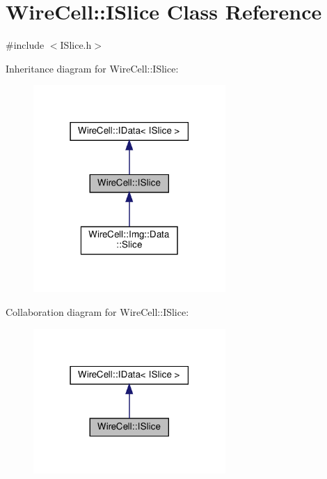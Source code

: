 \hypertarget{class_wire_cell_1_1_i_slice}{}\section{Wire\+Cell\+:\+:I\+Slice Class Reference}
\label{class_wire_cell_1_1_i_slice}


{\ttfamily \#include $<$I\+Slice.\+h$>$}



Inheritance diagram for Wire\+Cell\+:\+:I\+Slice\+:
\nopagebreak
\begin{figure}[H]
\begin{center}
\leavevmode
\includegraphics[width=207pt]{class_wire_cell_1_1_i_slice__inherit__graph}
\end{center}
\end{figure}


Collaboration diagram for Wire\+Cell\+:\+:I\+Slice\+:
\nopagebreak
\begin{figure}[H]
\begin{center}
\leavevmode
\includegraphics[width=207pt]{class_wire_cell_1_1_i_slice__coll__graph}
\end{center}
\end{figure}
